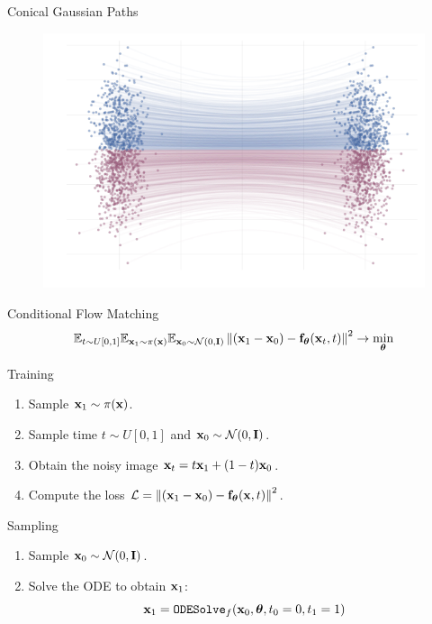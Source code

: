 \documentclass{beamer}
\begin{document}
\begin{frame}{Conical Gaussian Paths}
		\begin{minipage}[t]{0.5\columnwidth}
			\begin{figure}
				\centering
				\includegraphics[width=\linewidth]{figs/g2g-forward_samples}
			\end{figure}
	\end{minipage}
\end{frame}
\begin{frame}{Conditional Flow Matching}
	\vspace{-0.3cm}
	\[
	 \mathbb{E}_{t \sim U[0, 1]} \mathbb{E}_{\mathbf{x}_1 \sim \pi(\mathbf{x})} \mathbb{E}_{\mathbf{x}_0 \sim \mathcal{N}(0, \mathbf{I})}\left\| (\mathbf{x}_1 - \mathbf{x}_0) - \mathbf{f}_{\boldsymbol{\theta}}(\mathbf{x}_t, t) \right\|^2  \rightarrow \min_{\boldsymbol{\theta}}
	\]
	\begin{block}{Training}
		\begin{enumerate}
			\item Sample $\mathbf{x}_1 \sim \pi(\mathbf{x})$.
			\item Sample time $t \sim U[0, 1]$ and $\mathbf{x}_0 \sim \mathcal{N}(0, \mathbf{I})$.
			\item Obtain the noisy image $\mathbf{x}_t = t \mathbf{x}_1 + (1 - t) \mathbf{x}_0$.
			\item Compute the loss $ \mathcal{L} = \left\| (\mathbf{x}_1 - \mathbf{x}_0) - \mathbf{f}_{\boldsymbol{\theta}}(\mathbf{x}, t) \right\|^2 $.
		\end{enumerate}
	\end{block}
	\vspace{-0.3cm}
	\begin{block}{Sampling}
		\begin{enumerate}
			\item Sample $\mathbf{x}_0 \sim \mathcal{N}(0, \mathbf{I})$.
			\item Solve the ODE to obtain $\mathbf{x}_1$:
			\[
				\mathbf{x}_1 = \texttt{ODESolve}_f(\mathbf{x}_0, \boldsymbol{\theta}, t_0=0, t_1=1)
			\]
		\end{enumerate}
	\end{block}
\end{frame}
\end{document}
